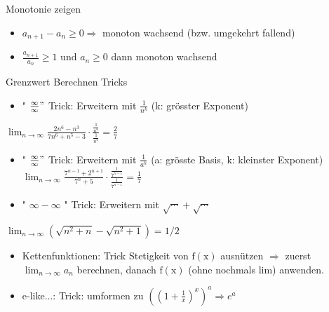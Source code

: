 \begin{KR}{Monotonie zeigen}
    \begin{itemize}
  \item $a_{n+1}-a_{n} \geq 0 \Rightarrow$ monoton wachsend (bzw. umgekehrt fallend)
  \item $\frac{a_{n+1}}{a_{n}} \geq 1$ und $a_{n} \geq 0$ dann monoton wachsend
\end{itemize}
\end{KR}

\begin{KR}{Grenzwert Berechnen Tricks}
\begin{itemize}
  \item " $\frac{\infty}{\infty} "$ Trick: Erweitern mit $\frac{1}{n^{k}}$ (k: grösster Exponent)
\end{itemize}

$\lim _{n \rightarrow \infty} \frac{2 n^{6}-n^{3}}{7 n^{6}+n^{5}-3} \cdot \frac{\frac{1}{n^{6}}}{\frac{1}{n^{6}}}=\frac{2}{7}$

\begin{itemize}
  \item " $\frac{\infty}{\infty} "$ Trick: Erweitern mit $\frac{1}{a^{k}}$ (a: grösste Basis, k: kleinster Exponent) $\lim _{n \rightarrow \infty} \frac{7^{n-1}+2^{n+1}}{7^{n}+5} \cdot \frac{\frac{1}{7^{n-1}}}{\frac{1}{7^{n-1}}}=\frac{1}{7}$
  \item " $\infty-\infty$ " Trick: Erweitern mit $\sqrt{\cdots}+\sqrt{\cdots}$
\end{itemize}

$\lim _{n \rightarrow \infty}\left(\sqrt{n^{2}+n}-\sqrt{n^{2}+1}\right)=1 / 2$

\begin{itemize}
  \item Kettenfunktionen: Trick Stetigkeit von $\mathrm{f}(\mathrm{x})$ ausnützen $\Rightarrow$ zuerst $\lim _{n \rightarrow \infty} a_{n}$ berechnen, danach $\mathrm{f}(\mathrm{x})$ (ohne nochmals lim) anwenden.
  \item e-like...: Trick: umformen zu $\left(\left(1+\frac{1}{x}\right)^{x}\right)^{a} \Rightarrow e^{a}$
\end{itemize}
\end{KR}

